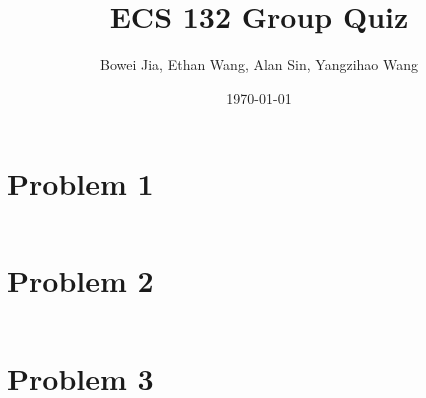 \documentclass[11pt]{article}
\title{ECS 132 Group Quiz}
\author{Bowei Jia, Ethan Wang, Alan Sin, Yangzihao Wang}
\date{\today}
\newcommand{\matindex}[1]{\mbox{\scriptsize#1}}
\begin{document}
\maketitle

\begin{comment}
\begin{align*}
E(L_2) &= E(L_1 - A_2 + B_2) \\
&=E(L_1) - E(A_2) + E(B_2) \\
&=(0.4\times 1 + 0.1\times 2) \times 2 - E(A_2) \\
E(A_2) &= \sum_{c}P(L_1=c)E(A_2|L_1=c) \\
&=0 + 0.4E(A_2|L_1=1) + 0.1E(A_2|L_1=2) \\
&=0.4 \times 0.2 \times 1 + 0.1 \times (0.2 \times 0.8 \times \binom{2}{1} \times 1 + 0.2 \times 0.2 \times 2) \\
&= 0.12\\
E(L_2) &= 1.2 - 0.12 = 1.08
\end{align*}

First define the initial state matrix $P$:
\[
  P=\begin{blockarray}{c@{\hspace{5pt}}rrrr@{\hspace{5pt}}cl}
    & \matindex{1} & \matindex{2} & \matindex{3} & \matindex{4} & & \\
    \begin{block}{(c@{\hspace{5pt}}rrrr@{\hspace{5pt}}c)l}
      & 0 &  \frac{1}{3} & \frac{1}{3} & \frac{1}{3} & & \matindex{1} \\
      & 0 &  0 & \frac{2}{3} & \frac{1}{3} & & \matindex{2} \\
      & 0 &  \frac{1}{3} & \frac{1}{3} & \frac{1}{3} & & \matindex{3} \\
      & \frac{1}{3} &  \frac{1}{3} & \frac{1}{3} & 0 & & \matindex{4} \\
    \end{block}
  \end{blockarray}
\]
Reasoning:
\begin{itemize}
\item[At state 1:] 
\item[At state 2:] 
\item[At state 3:]
\item[At state 4:]
\end{itemize}
\end{comment}

\section*{Problem 1}
\begin{lstlisting}[language=R]

\end{lstlisting}
\section*{Problem 2}
\begin{lstlisting}[language=R]

\end{lstlisting}
\section*{Problem 3}
\begin{lstlisting}[language=R]

\end{lstlisting}
\end{document}

